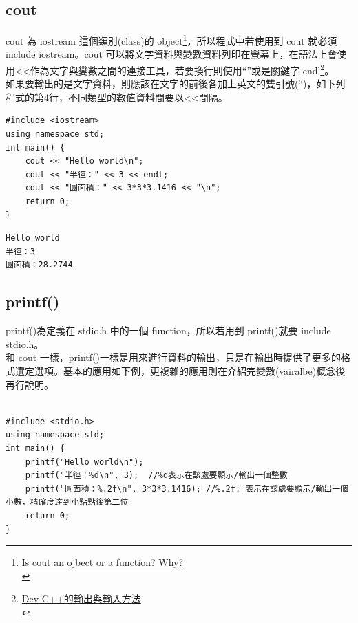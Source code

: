 \documentclass[a4paper,12pt]{article}
\begin{document}
\subsection{cout}
\label{sec:org8b8ca99}
cout 為 iostream 這個類別(class)的 object\footnote{\href{https://www.quora.com/Is-cout-an-object-or-a-function-Why}{Is cout an ojbect or a function? Why?}\\}，所以程式中若使用到 cout 就必須 include iostream。cout 可以將文字資料與變數資料列印在螢幕上，在語法上會使用<<作為文字與變數之間的連接工具，若要換行則使用``\n''或是關鍵字 endl\footnote{\href{http://rs2.ocu.edu.tw/\~jengchi/IO\_instruction.htm}{Dev C++的輸出與輸入方法}\\}。\\

如果要輸出的是文字資料，則應該在文字的前後各加上英文的雙引號(``)，如下列程式的第4行，不同類型的數值資料間要以<<間隔。\\

\lstset{breaklines=true,language=cpp,label= ,caption= ,captionpos=b,firstnumber=1,numbers=left}
\begin{lstlisting}
#include <iostream>
using namespace std;
int main() {
    cout << "Hello world\n";
    cout << "半徑：" << 3 << endl;
    cout << "圓面積：" << 3*3*3.1416 << "\n";
    return 0;
}
\end{lstlisting}

\begin{verbatim}
Hello world
半徑：3
圓面積：28.2744
\end{verbatim}

\subsection{printf()}
\label{cpp_printf}
printf()為定義在 stdio.h 中的一個 function，所以若用到 printf()就要 include stdio.h。\\

和 cout 一樣，printf()一樣是用來進行資料的輸出，只是在輸出時提供了更多的格式選定選項。基本的應用如下例，更複雜的應用則在介紹完變數(vairalbe)概念後再行說明。\\
\lstset{breaklines=true,language=cpp,label= ,caption= ,captionpos=b,firstnumber=1,numbers=left}
\begin{lstlisting}

#include <stdio.h>
using namespace std;
int main() {
    printf("Hello world\n");
    printf("半徑：%d\n", 3);  //%d表示在該處要顯示/輸出一個整數
    printf("圓面積：%.2f\n", 3*3*3.1416); //%.2f: 表示在該處要顯示/輸出一個小數，精確度達到小點點後第二位
    return 0;
}
\end{lstlisting}
\end{document}
